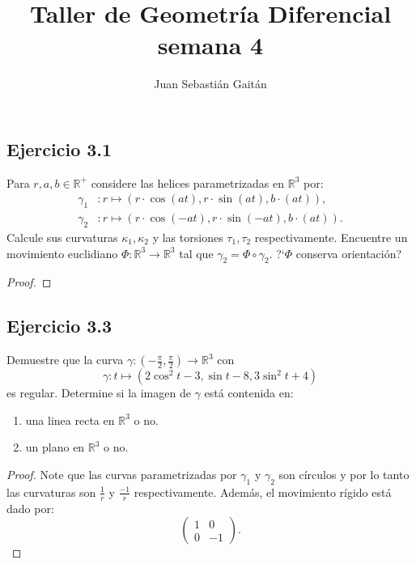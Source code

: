 \documentclass[12pt]{article}
\title{Taller de Geometr\'ia Diferencial semana 4 }
\author{Juan Sebasti\'an Gait\'an}
\begin{document}
\maketitle

\vspace{0.5in}



\subsection*{Ejercicio 3.1}
Para $r,a,b\in \mathbb{R}^{+}$  considere las helices parametrizadas en $\mathbb{R}^{3}$ por:
\begin{equation*}
\begin{split}
\gamma_{1}&: r \mapsto (r \cdot \cos (at), r \cdot \sin (at), b \cdot (at)), \\
\gamma_{2}&: r \mapsto (r \cdot \cos (-at), r \cdot \sin (-at) , b \cdot (at)).
\end{split}
\end{equation*}
Calcule sus curvaturas $\kappa_1 , \kappa_2 $ y las torsiones $\tau_1 , \tau_2$ respectivamente. Encuentre un movimiento euclidiano $\Phi: \mathbb{R}^3 \rightarrow \mathbb{R}^3$ tal que $\gamma_2=\Phi \circ \gamma_2$. ?`$\Phi$ conserva orientaci\'on?
\begin{proof}
\end{proof}



\subsection*{Ejercicio 3.3}
 Demuestre que la curva $\gamma :(-\frac{\pi}{2},\frac{\pi}{2}) \rightarrow \mathbb{R}^3$ con
\begin{equation*}
   \gamma :t \mapsto (2 \cos^2 t -3 , \sin t - 8 , 3 \sin ^2 t + 4)
\end{equation*}
es regular. Determine si la imagen de $\gamma$ est\'a contenida en:
\begin{enumerate}
  \item una linea recta en $\mathbb{R}^3$ o no.
  \item un plano en $\mathbb{R}^3$ o no.
\end{enumerate}


\begin{proof}
Note que las curvas parametrizadas por $\gamma_{1}$ y  $\gamma_{2}$ son c\'irculos y por lo tanto las curvaturas son $\frac{1}{r}$ y $\frac{-1}{r}$ respectivamente. Adem\'as, el movimiento r\'igido est\'a dado por:
\begin{equation*}
\begin{pmatrix} 1 & 0 \\ 0 & -1 \end{pmatrix}.
\end{equation*}
\end{proof}
\end{document}
